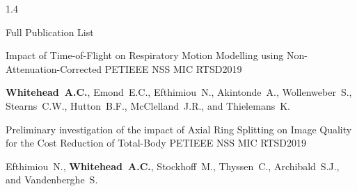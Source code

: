 \documentclass{cv}
\begin{document}
\begin{spacing}{1.4}
\begin{rSection}{Full Publication List}
            \vspace{-0.5cm}
            \item \begin{rSubsection}{Impact of Time-of-Flight on Respiratory Motion Modelling using Non-Attenuation-Corrected \newline PET}{}{IEEE NSS MIC RTSD}{2019}
                \vspace{-0.25cm}
                \item \textbf{Whitehead~A.C.}, Emond~E.C., Efthimiou~N., Akintonde~A., Wollenweber~S., Stearns~C.W., Hutton~B.F., McClelland~J.R., and Thielemans~K.
            \end{rSubsection}
    
            \vspace{-0.5cm}
            \item \begin{rSubsection}{Preliminary investigation of the impact of Axial Ring Splitting on Image Quality for the Cost Reduction of Total-Body PET}{}{IEEE NSS MIC RTSD}{2019}
                \vspace{-0.25cm}
                \item Efthimiou~N., \textbf{Whitehead~A.C.}, Stockhoff~M., Thyssen~C., Archibald~S.J., and Vandenberghe~S.
            \end{rSubsection}
        \end{rSection}
    \end{spacing}
\end{document}
